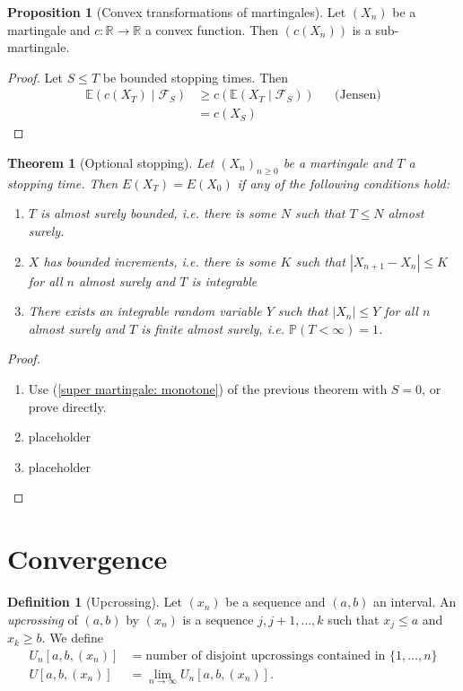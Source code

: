 \documentclass[parskip=full]{article}
\newtheorem{theorem}{Theorem}[section]
\theoremstyle{definition}
\newtheorem*{definition}{Definition}
\newtheorem{proposition}{Proposition}[section]
\newcommand{\R}{\mathbb{R}}
\newcommand{\Pbb}{\mathbb{P}}
\newcommand{\1}{\mathbbm{1}}
\newcommand{\E}{\mathbb{E}}
\begin{document}
\begin{proposition}[Convex transformations of martingales]
  Let $(X_n)$ be a martingale and $c: \R \to \R$ a convex function. Then $(c(X_n))$ is a sub-martingale.
\end{proposition}

\begin{proof}
  Let $S \leq T$ be bounded stopping times. Then
  \begin{align*}
    \E(c(X_T) \mid \mathcal{F}_S) & \geq c(\E(X_T \mid \mathcal{F}_S)) &   & \text{(Jensen)} \\
                                  & = c(X_S)                          
  \end{align*}
\end{proof}

\begin{theorem}[Optional stopping]
  Let $(X_n)_{n \geq 0}$ be a martingale and $T$ a stopping time. Then $E(X_T) = E(X_0)$ if any of the following conditions hold:
  \begin{enumerate}
    \item $T$ is almost surely bounded, i.e. there is some $N$ such that $T \leq N$ almost surely.
    \item $X$ has bounded increments, i.e. there is some $K$ such that $|X_{n+1} - X_n| \leq K$ for all $n$ almost surely and $T$ is integrable
    \item There exists an integrable random variable $Y$ such that $|X_n| \leq Y$ for all $n$ almost surely and $T$ is finite almost surely, i.e. $\Pbb(T < \infty) = 1$.
  \end{enumerate}
\end{theorem}

\begin{proof}
  \begin{enumerate}
    \item Use (\ref{super martingale: monotone}) of the previous theorem with $S = 0$, or prove directly.
    \item placeholder
    \item placeholder
  \end{enumerate}
\end{proof}

\section{Convergence}
\begin{definition}[Upcrossing]
  Let $(x_n)$ be a sequence and $(a, b)$ an interval. An \emph{upcrossing} of $(a, b)$ by $(x_n)$ is a sequence $j, j + 1, \ldots, k$ such that $x_j \leq a$ and $x_k \geq b$. We define\index{$U[a, b, (x_n)$}
  \begin{align*}
    U_n[a, b, (x_n)] & = \text{number of disjoint upcrossings contained in }\{1, \ldots, n\} \\
    U[a, b, (x_n)]   & = \lim_{n \to \infty} U_n[a, b, (x_n)].
  \end{align*}
\end{definition}
\end{document}
